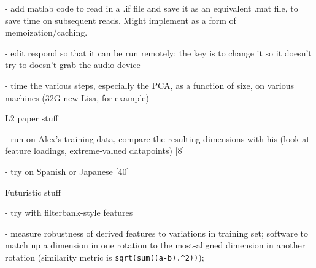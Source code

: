 \documentclass[11pt]{article}
\begin{document}
- add matlab code to read in a .if file and save it as an equivalent .mat file,
  to save time on subsequent reads.  Might implement as a form of memoization/caching.

- edit respond so that it can be run remotely; the key is to change
it so it doesn't try to doesn't grab the audio device

-  time the various steps, especially the PCA, as a function of size,
on various machines (32G new Lisa, for example)

L2 paper stuff

- run on Alex's training data, compare the resulting dimensions
with his (look at feature loadings,  extreme-valued datapoints) [8]

-  try on Spanish or Japanese [40]

Futuristic stuff

-  try with filterbank-style features

-  measure robustness of derived features to variations in training
set; software to match up a dimension in one rotation to the
most-aligned dimension in another rotation (similarity metric is
\verb+sqrt(sum((a-b).^2))+);


\end{document}
